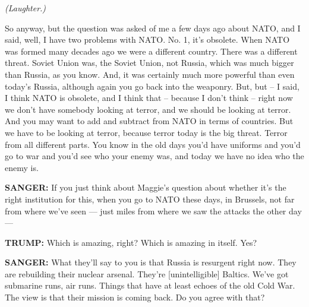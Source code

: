 \emph{(Laughter.)}

So anyway, but the question was asked of me a few days ago about NATO,
and I said, well, I have two problems with NATO. No. 1, it's obsolete.
When NATO was formed many decades ago we were a different country. There
was a different threat. Soviet Union was, the Soviet Union, not Russia,
which was much bigger than Russia, as you know. And, it was certainly
much more powerful than even today's Russia, although again you go back
into the weaponry. But, but -- I said, I think NATO is obsolete, and I
think that -- because I don't think -- right now we don't have somebody
looking at terror, and we should be looking at terror. And you may want
to add and subtract from NATO in terms of countries. But we have to be
looking at terror, because terror today is the big threat. Terror from
all different parts. You know in the old days you'd have uniforms and
you'd go to war and you'd see who your enemy was, and today we have no
idea who the enemy is.

\textbf{SANGER:} If you just think about Maggie's question about whether
it's the right institution for this, when you go to NATO these days, in
Brussels, not far from where we've seen --- just miles from where we saw
the attacks the other day ---

\textbf{TRUMP:} Which is amazing, right? Which is amazing in itself.
Yes?

\textbf{SANGER:} What they'll say to you is that Russia is resurgent
right now. They are rebuilding their nuclear arsenal. They're
{[}unintelligible{]} Baltics. We've got submarine runs, air runs. Things
that have at least echoes of the old Cold War. The view is that their
mission is coming back. Do you agree with that?

